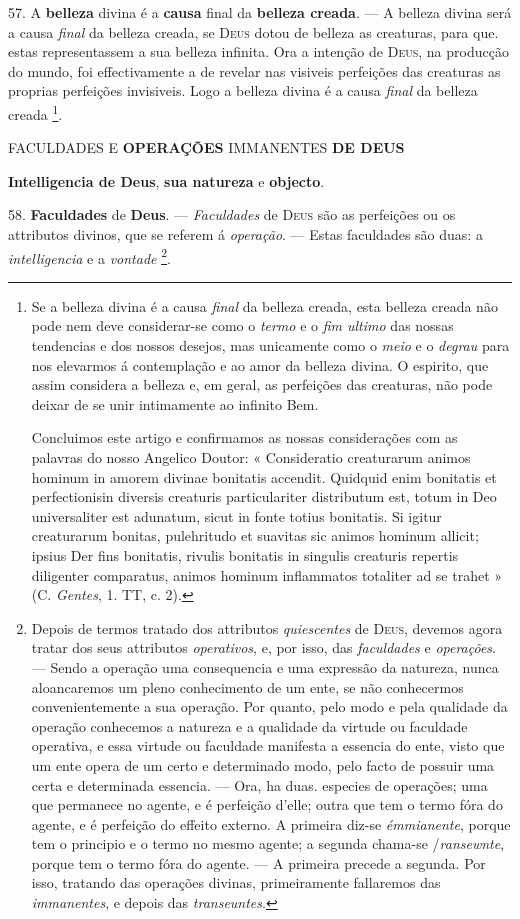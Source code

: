 57. A \textbf{belleza} divina é a \textbf{causa} final da \textbf{belleza creada}. --- A belleza divina será a causa \emph{final} da belleza creada, se \textsc{Deus} dotou de belleza as creaturas, para que. estas representassem a sua belleza infinita. Ora a intenção de \textsc{Deus}, na producção do mundo, foi effectivamente a de revelar nas visiveis perfeições das creaturas as proprias perfeições invisiveis. Logo a belleza divina é a causa \emph{final} da belleza creada \footnote{Se a belleza divina é a causa \emph{final} da belleza creada, esta belleza creada não pode nem deve considerar-se como o \emph{termo} e o \emph{fim ultimo} das nossas tendencias e dos nossos desejos, mas unicamente como o \emph{meio} e o \emph{degrau} para nos elevarmos á contemplação e ao amor da belleza divina. O espirito, que assim considera a belleza e, em geral, as perfeições das creaturas, não pode deixar de se unir intimamente ao infinito Bem.\par Concluimos este artigo e confirmamos as nossas considerações com as palavras do nosso Angelico Doutor: « Consideratio creaturarum animos hominum in amorem divinae bonitatis accendit. Quidquid enim bonitatis et perfectionisin diversis creaturis particulariter distributum est, totum in Deo universaliter est adunatum, sicut in fonte totius bonitatis. Si igitur creaturarum bonitas, pulehritudo et suavitas sic animos hominum allicit; ipsius Der fins bonitatis, rivulis bonitatis in singulis creaturis repertis diligenter comparatus, animos hominum inflammatos totaliter ad se trahet » (C. \emph{Gentes}, 1. TT, c. 2).}.

 FACULDADES E \textbf{OPERAÇÕES} IMMANENTES \textbf{DE DEUS}

\textbf{Intelligencia de Deus}, \textbf{sua natureza} e \textbf{objecto}.

58. \textbf{Faculdades} de \textbf{Deus}. --- \emph{Faculdades} de \textsc{Deus} são as perfeições ou os attributos divinos, que se referem á \emph{operação}. --- Estas faculdades são duas: a \emph{intelligencia} e a \emph{vontade} \footnote{Depois de termos tratado dos attributos \emph{quiescentes} de \textsc{Deus}, devemos agora tratar dos seus attributos \emph{operativos}, e, por isso, das \emph{faculdades} e \emph{operações}. --- Sendo a operação uma consequencia e uma expressão da natureza, nunca aloancaremos um pleno conhecimento de um ente, se não conhecermos convenientemente a sua operação. Por quanto, pelo modo e pela qualidade da operação conhecemos a natureza e a qualidade da virtude ou faculdade operativa, e essa virtude ou faculdade manifesta a essencia do ente, visto que um ente opera de um certo e determinado modo, pelo facto de possuir uma certa e determinada essencia. --- Ora, ha duas. especies de operações; uma que permanece no agente, e é perfeição d'elle; outra que tem o termo fóra do agente, e é perfeição do effeito externo. A primeira diz-se \emph{émmianente}, porque tem o principio e o termo no mesmo agente; a segunda chama-se /\emph{ransewnte}, porque tem o termo fóra do agente. --- A primeira precede a segunda. Por isso, tratando das operações divinas, primeiramente fallaremos das \emph{immanentes}, e depois das \emph{transeuntes}.}.

